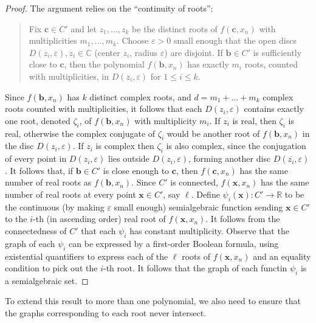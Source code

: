 \documentclass[
]{book}
\theoremstyle{definition}
\theoremstyle{definition}
\theoremstyle{definition}
\theoremstyle{definition}
\theoremstyle{remark}
\begin{document}
\begin{proof}
The argument relies on the ``continuity of roots'':

\begin{quote}
Fix \(\mathbf{c} \in C'\) and let \(z_1,\ldots,z_k\) be the distinct roots of \(f(\mathbf{c},x_n)\) with multiplicities \(m_1,\ldots,m_k\).
Choose \(\varepsilon > 0\) small enough that the open discs \(D(z_i,\varepsilon), z_i \in \mathbb{C}\) (center \(z_i\), radius \(\varepsilon\)) are disjoint. If \(\mathbf{b} \in C'\) is sufficiently close to \(\mathbf{c}\), then the polynomial \(f(\mathbf{b}, x_n)\) has exactly \(m_i\) roots, counted with multiplicities, in \(D(z_i,\varepsilon)\) for \(1\le i \le k\).
\end{quote}

Since \(f(\mathbf{b},x_n)\) has \(k\) distinct complex roots, and \(d = m_1+ \ldots + m_k\) complex roots counted with multiplicities, it follows that each \(D(z_i,\varepsilon)\) contains exactly one root, denoted \(\zeta_i\), of \(f(\mathbf{b},x_n)\) with multiplicity \(m_i\).
If \(z_i\) is real, then \(\zeta_i\) is real, otherwise the complex conjugate of \(\zeta_i\) would be another root of \(f(\mathbf{b},x_n)\) in the disc \(D(z_i,\varepsilon)\).
If \(z_i\) is complex then \(\zeta_i\) is also complex, since the conjugation of every point in \(D(z_i, \varepsilon)\) lies outside \(D(z_i, \varepsilon)\), forming another disc \(D(\overline{z_i}, \varepsilon)\).
It follows that, if \(\mathbf{b} \in C'\) is close enough to \(\mathbf{c}\), then \(f(\mathbf{c},x_n)\) has the same number of real roots as \(f(\mathbf{b},x_n)\). Since \(C'\) is connected, \(f(\mathbf{x},x_n)\) has the same number of real roots at every point \(\mathbf{x} \in C'\), say \(\ell\).
Define \(\psi_i(\mathbf{x}) : C' \to \mathbb{R}\) to be the continuous (by making \(\varepsilon\) small enough) semialgebraic function sending \(\mathbf{x} \in C'\) to the \(i\)-th (in ascending order) real root of \(f(\mathbf{x},x_n)\). It follows from the connectedness of \(C'\) that each \(\psi_i\) has constant multiplicity.
Observe that the graph of each \(\psi_i\) can be expressed by a first-order Boolean formula, using existential quantifiers to express each of the \(\ell\) roots of \(f(\mathbf{x},x_n)\) and an equality condition to pick out the \(i\)-th root.
It follows that the graph of each functin \(\psi_i\) is a semialgebraic set.
\end{proof}

To extend this result to more than one polynomial, we also need to ensure that the graphs corresponding to each root never intersect.
\end{document}
